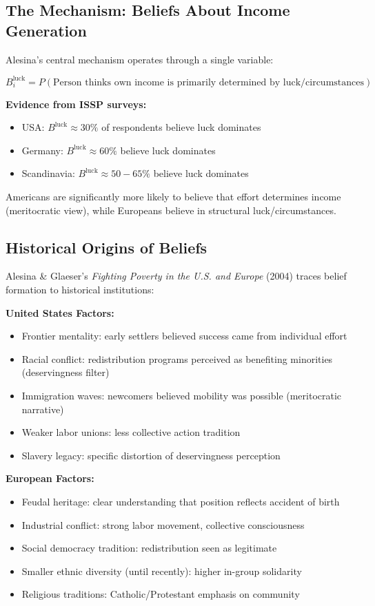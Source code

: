 \subsection{The Mechanism: Beliefs About Income Generation}

Alesina's central mechanism operates through a single variable:

\begin{equation}
B_i^{\text{luck}} = P(\text{Person thinks own income is primarily determined by luck/circumstances})
\end{equation}

\textbf{Evidence from ISSP surveys:}
\begin{itemize}
\item USA: $B^{\text{luck}} \approx 30\%$ of respondents believe luck dominates
\item Germany: $B^{\text{luck}} \approx 60\%$ believe luck dominates
\item Scandinavia: $B^{\text{luck}} \approx 50-65\%$ believe luck dominates
\end{itemize}

Americans are significantly more likely to believe that effort determines income (meritocratic view), while Europeans believe in structural luck/circumstances.

\subsection{Historical Origins of Beliefs}

Alesina \& Glaeser's \emph{Fighting Poverty in the U.S. and Europe} (2004) traces belief formation to historical institutions:

\textbf{United States Factors:}
\begin{itemize}
\item Frontier mentality: early settlers believed success came from individual effort
\item Racial conflict: redistribution programs perceived as benefiting minorities (deservingness filter)
\item Immigration waves: newcomers believed mobility was possible (meritocratic narrative)
\item Weaker labor unions: less collective action tradition
\item Slavery legacy: specific distortion of deservingness perception
\end{itemize}

\textbf{European Factors:}
\begin{itemize}
\item Feudal heritage: clear understanding that position reflects accident of birth
\item Industrial conflict: strong labor movement, collective consciousness
\item Social democracy tradition: redistribution seen as legitimate
\item Smaller ethnic diversity (until recently): higher in-group solidarity
\item Religious traditions: Catholic/Protestant emphasis on community
\end{itemize}

